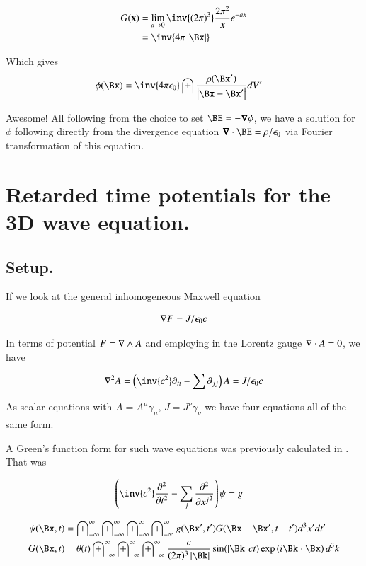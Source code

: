 \documentclass{article}
\newcommand{\PDSq}[2]{\frac{\partial^2 {#2}}{\partial {#1}^2}}
\newcommand{\IIinf}[0]{ \int_{-\infty}^\infty }
\begin{document}
\begin{align*}
G(\mathbf{x})
&= \lim_{a \rightarrow 0} \inv{(2\pi)^3} \frac{2 \pi^2}{x} e^{ - a x } \\
&= \inv{4\pi\Abs{\Bx}}
\end{align*}

Which gives
\begin{align*}
\phi(\Bx) &= \inv{4\pi \epsilon_0} \int \frac{\rho(\Bx')}{\Abs{\Bx - \Bx'}} dV'
\end{align*}

Awesome!  All following from the choice to set $\BE = -\spacegrad \phi$, we have a solution for $\phi$ following directly
from the divergence equation $\spacegrad \cdot \BE = \rho/\epsilon_0$ via Fourier transformation of this equation.

\section{ Retarded time potentials for the 3D wave equation. }

\subsection{ Setup. }

If we look at the general inhomogeneous Maxwell equation

\begin{align}
\nabla F = J/\epsilon_0 c
\end{align}

In terms of potential $F = \nabla \wedge A$ and employing in the Lorentz gauge $\nabla \cdot A = 0$, we have

\begin{align}
\grad^2 A = \left(\inv{c^2} \partial_{tt} - \sum \partial_{jj}\right) A = J/\epsilon_0 c
\end{align}

As scalar equations with $A = A^\mu \gamma_\mu$, $J = J^\nu \gamma_\nu$ we have four equations all of the same form.

A Green's function form for such wave equations was previously calculated in \cite{PJfourierMaxwellSecondOrder}.  That was

\begin{align}
\left( \inv{c^2} \PDSq{t}{} -\sum_j \PDSq{x^j}{} \right)\psi &= g
\end{align}

\begin{align}
{\psi}(\Bx, t) &= \IIinf \IIinf \IIinf \IIinf g(\Bx', t') G(\Bx - \Bx', t - t') d^3 x' dt' \\
G(\Bx, t) &= \theta(t) \IIinf \IIinf \IIinf \frac{c}{(2\pi)^3 \Abs{\Bk}} \sin( \Abs{\Bk} c t ) \exp\left( i \Bk \cdot \Bx \right) d^3 k
\end{align}
\end{document}
